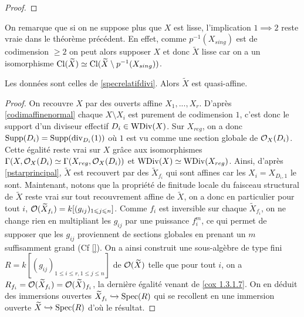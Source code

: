 \begin{proof}
\end{proof}

\begin{rem}
On remarque que si on ne suppose plus que $X$ est lisse, l'implication $1\implies 2$ reste vraie dans le théorème précédent. En effet, comme $p^{-1}(X_{sing})$ est de codimension $\geq 2$ on peut alors supposer $X$ et donc $\widetilde{X}$ lisse car on a un isomorphisme $\operatorname{Cl}(\widetilde{X})\simeq\operatorname{Cl}(\widetilde{X}\setminus p^{-1}(X_{sing}))$. 
\end{rem}


\begin{cor}\label{specrelatifQuasiAff}
Les données sont celles de \ref{specrelatifdivi}. Alors $\widetilde{X}$ est quasi-affine.
\end{cor}
\begin{proof}
On recouvre $X$ par des ouverts affine $X_1,...,X_r$. D'après \ref{codimaffinenormal} chaque $X\setminus X_i$ est purement de codimension $1$, c'est donc le support d'un diviseur effectif $D_i\in \operatorname{WDiv}(X)$. Sur $X_{reg}$, on a donc $\operatorname{Supp}(D_i)=\operatorname{Supp}(\operatorname{div}_{D_i}(1))$ où $1$ est vu comme une section globale de $\mathcal{O}_X(D_i)$. Cette égalité reste vrai sur $X$ grâce aux isomorphismes $\Gamma(X ,\mathcal{O}_X(D_i)\simeq\Gamma(X_{reg} ,\mathcal{O}_X(D_i))$ et $\operatorname{WDiv}(X)\simeq\operatorname{WDiv}(X_{reg})$. Ainsi, d'après \ref{pstarprincipal}, $\widetilde{X}$ est recouvert par des $\widetilde{X}_{f_i}$ qui sont affines car les $X_i=X_{D_i,1}$ le sont. Maintenant, notons que la propriété de finitude locale du faisceau structural de $\widetilde{X}$ reste vrai sur tout recouvrement affine de $\widetilde{X}$, on a donc en particulier pour tout $i$, $\mathcal{O}(\widetilde{X}_{f_i})=k[(g_{ij})_{1\leqslant j\leqslant n}]$. Comme $f_i$ est inversible sur chaque $\widetilde{X}_{f_i}$, on ne change rien en multipliant les $g_{ij}$ par une puissance $f_i^m$, ce qui permet de supposer que les $g_{ij}$ proviennent de sections globales en prenant un $m$ suffisamment grand (Cf \ref{}). On a ainsi construit une sous-algèbre de type fini $R=k[(g_{ij})_{1\leq i\leq r, 1\leq j\leq n}]$ de $\mathcal{O}(\widetilde{X})$ telle que pour tout $i$, on a $R_{f_i}=\mathcal{O}({\widetilde{X}_{f_i}})=\mathcal{O}({\widetilde{X}})_{f_i}$, la dernière égalité venant de \ref{cox 1.3.1.7}. On en déduit des immersions ouvertes $\widetilde{X}_{f_i}\xhookrightarrow{} \operatorname{Spec}(R)$ qui se recollent en une immersion ouverte $\widetilde{X}\xhookrightarrow{} \operatorname{Spec}(R)$ d'où le résultat.
\end{proof}

